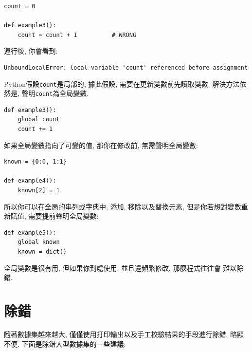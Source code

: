 \documentclass[10pt]{book}
\begin{document}
\begin{verbatim}
count = 0

def example3():
    count = count + 1          # WRONG
\end{verbatim}
%
運行後, 你會看到:

\begin{verbatim}
UnboundLocalError: local variable 'count' referenced before assignment
\end{verbatim}
%
Python假設{\tt count}是局部的, 據此假設, 需要在更新變數前先讀取變數. 
解決方法依然是, 聲明{\tt count}為全局變數. 

\begin{verbatim}
def example3():
    global count
    count += 1
\end{verbatim}
%
如果全局變數指向了可變的值, 那你在修改前, 無需聲明全局變數:

\begin{verbatim}
known = {0:0, 1:1}

def example4():
    known[2] = 1
\end{verbatim}
%
所以你可以在全局的串列或字典中, 添加, 移除以及替換元素, 
但是你若想對變數重新賦值, 需要提前聲明全局變數:

\begin{verbatim}
def example5():
    global known
    known = dict()
\end{verbatim}
%
全局變數是很有用, 但如果你到處使用, 並且還頻繁修改, 那麼程式往往會
難以除錯. 


\section{除錯}
隨著數據集越來越大, 僅僅使用打印輸出以及手工校驗結果的手段進行除錯, 略顯不便. 
下面是除錯大型數據集的一些建議:
\end{document}
